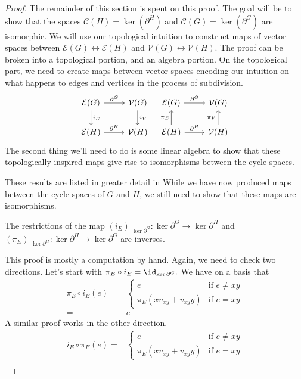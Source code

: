 \begin{proof}
The remainder of this section is spent on this proof. 
The goal will be to show that the spaces $\mathcal C(H)= \ker(\partial^H)$ and $\mathcal C(G)=\ker(\partial^G)$ are isomorphic.
We will use our topological intuition to construct maps of vector spaces between $\mathcal E(G)\leftrightarrow \mathcal E(H)$ and $\mathcal V(G)\leftrightarrow \mathcal V(H)$.
The proof can be broken into a topological portion, and an algebra portion.
On the topological part, we need to create maps between vector spaces encoding our intuition on what happens to edges and vertices in the process of subdivision. \[\begin{tikzcd}
\mathcal E(G)\arrow{r}{\partial^G} \arrow{d}{i_E} & \mathcal V(G) \arrow{d}{i_V}\\
\mathcal E(H)\arrow{r}{\partial^H} & \mathcal V(H)
\end{tikzcd}\;\;\;\begin{tikzcd}
\mathcal E(G)\arrow{r}{\partial^G}& \mathcal V(G) \\
\mathcal E(H)\arrow{r}{\partial^H} \arrow{u}{\pi_E}  & \mathcal V(H) \arrow{u}{\pi_V}
\end{tikzcd}\]
The second thing we'll need to do is some linear algebra to show that these topologically inspired maps give rise to isomorphisms between the cycle spaces.

These results are listed in greater detail in 
While we have now produced maps between the cycle spaces of $G$ and $H$, we still need to show that these maps are isomorphisms.  
\begin{claim}
The restrictions of the map $(i_E)|_{\ker \partial^G}: \ker \partial^G\to \ker \partial^H$ and $(\pi_E)|_{\ker \partial^H}: \ker \partial^H\to \ker \partial^G$ are inverses.
\end{claim}
This proof is mostly a computation by hand. Again, we need to check two directions. Let's start with $\pi_E\circ i_E=\id_{\ker \partial^G}.$ We have on a basis that 
\begin{align*}
\pi_E\circ i_E(e) = & \left\{\begin{array}{ll} e & \text{if $e\neq xy$}\\ \pi_E(xv_{xy}+v_{xy}y ) & \text{if $e=xy$}\end{array}\right.\\
= & e	
\end{align*}
A similar proof works in the other direction. 
\begin{align*}
i_E\circ \pi_E(e) = & \left\{\begin{array}{ll} e & \text{if $e\neq xy$}\\ \pi_E(xv_{xy}+v_{xy}y ) & \text{if $e=xy$}\end{array}\right.\\

\end{align*}
\end{proof}
